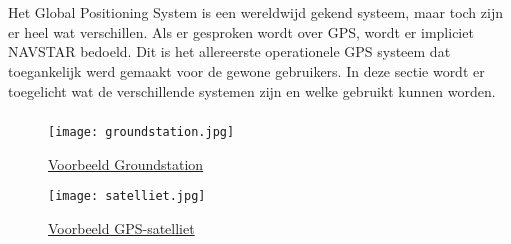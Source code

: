 \chapter{}
\label{ch:stand-van-zaken}


\section{}
Het Global Positioning System is een wereldwijd gekend systeem, maar toch zijn er heel wat verschillen. Als er gesproken wordt over GPS, wordt er impliciet NAVSTAR bedoeld. Dit is het allereerste operationele GPS systeem dat toegankelijk werd gemaakt voor de gewone gebruikers. In deze sectie wordt er toegelicht wat de verschillende systemen zijn en welke gebruikt kunnen worden.
\subsection{}
\begin{figure}
	\texttt{[image: groundstation.jpg]}
	\caption{\href{https://www.esa.int/About_Us/ESAC/Cebreros_ground_stationt}{Voorbeeld Groundstation}}
	\label{fig:groundstation}
\end{figure}
\begin{figure}
	\texttt{[image: satelliet.jpg]}
	\caption{\href{https://spacenews.com/40530gps-2f-6-navigation-satellite-slated-to-launch-on-may-15/}{Voorbeeld GPS-satelliet}}
	\label{fig:satelliet}
\end{figure}

